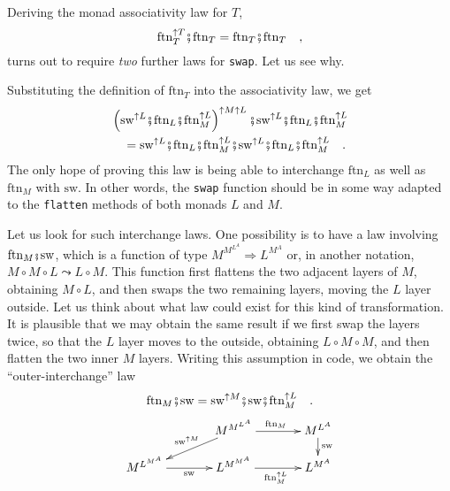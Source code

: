 Deriving the monad associativity law for $T$,
\[
\text{ftn}_{T}^{\uparrow T}\bef\text{ftn}_{T}=\text{ftn}_{T}\bef\text{ftn}_{T}\quad,
\]
turns out to require \emph{two} further laws for \lstinline!swap!.
Let us see why.

Substituting the definition of $\text{ftn}_{T}$ into the associativity
law, we get
\begin{align}
 & \left(\text{sw}^{\uparrow L}\bef\text{ftn}_{L}\bef\text{ftn}_{M}^{\uparrow L}\right)^{\uparrow M\uparrow L}\bef\text{sw}^{\uparrow L}\bef\text{ftn}_{L}\bef\text{ftn}_{M}^{\uparrow L}\nonumber \\
 & \quad=\text{sw}^{\uparrow L}\bef\text{ftn}_{L}\bef\text{ftn}_{M}^{\uparrow L}\bef\text{sw}^{\uparrow L}\bef\text{ftn}_{L}\bef\text{ftn}_{M}^{\uparrow L}\quad.\label{eq:t-assoc-law-expanded}
\end{align}
The only hope of proving this law is being able to interchange $\text{ftn}_{L}$
as well as $\text{ftn}_{M}$ with $\text{sw}$. In other words, the
\texttt{}\lstinline!swap!
function should be in some way adapted to the \texttt{}\lstinline!flatten!
methods of both monads $L$ and $M$.

Let us look for such interchange laws. One possibility is to have
a law involving $\text{ftn}_{M}\bef\text{sw}$, which is a function
of type $M^{M^{L^{A}}}\Rightarrow L^{M^{A}}$ or, in another notation,
$M\circ M\circ L\leadsto L\circ M$. This function first flattens
the two adjacent layers of $M$, obtaining $M\circ L$, and then swaps
the two remaining layers, moving the $L$ layer outside. Let us think
about what law could exist for this kind of transformation. It is
plausible that we may obtain the same result if we first swap the
layers twice, so that the $L$ layer moves to the outside, obtaining
$L\circ M\circ M$, and then flatten the two inner $M$ layers. Writing
this assumption in code, we obtain the ``outer-interchange'' law
\begin{equation}
\text{ftn}_{M}\bef\text{sw}=\text{sw}^{\uparrow M}\bef\text{sw}\bef\text{ftn}_{M}^{\uparrow L}\quad.\label{eq:swap-law-3-M-interchange}
\end{equation}
\[
\xymatrix{\xyScaleY{1pc}\xyScaleX{3pc} & M^{M^{L^{A}}}\ar[r]\sp(0.5){\text{ftn}_{M}}\ar[ld]\sb(0.45){\text{sw}^{\uparrow M}} & M^{L^{A}}\ar[d]\sp(0.4){\text{sw}}\\
M^{L^{M^{A}}}\ar[r]\sb(0.5){\text{sw}} & L^{M^{M^{A}}}\ar[r]\sb(0.5){\text{ftn}_{M}^{\uparrow L}} & L^{M^{A}}
}
\]

